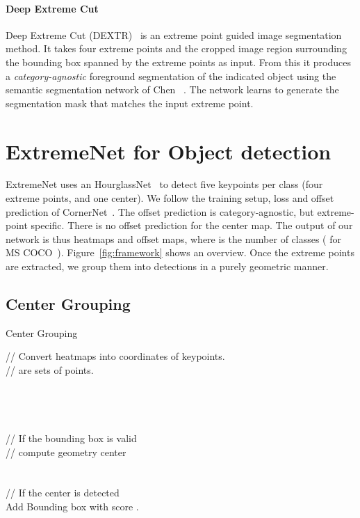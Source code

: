 \documentclass[10pt,twocolumn,letterpaper]{article}
\begin{document}
\paragraph{Deep Extreme Cut}
Deep Extreme Cut (DEXTR)~\cite{Man+18} is an extreme point guided image segmentation method. 
It takes four extreme points and the cropped image region surrounding the bounding box spanned by the extreme points as input.
From this it produces a \emph{category-agnostic} foreground segmentation of the indicated object using the semantic segmentation network of Chen \etal~\cite{chen2018deeplab}.
The network learns to generate the segmentation mask that matches the input extreme point. 

\section{ExtremeNet for Object detection}

ExtremeNet uses an HourglassNet~\cite{newell2016stacked} to detect five keypoints per class (four extreme points, and one center).
We follow the training setup, loss and offset prediction of CornerNet~\cite{Law_2018_ECCV}.
The offset prediction is category-agnostic, but extreme-point specific.
There is no offset prediction for the center map.
The output of our network is thus  heatmaps and  offset maps, where  is the number of classes ( for MS COCO~\cite{lin2014microsoft}).
Figure~\ref{fig:framework} shows an overview.
Once the extreme points are extracted, we group them into detections in a purely geometric manner.

\subsection{Center Grouping}
\label{sec:grouping}
\begin{algorithm}[t]\footnotesize
	\caption{\footnotesize Center Grouping}
	\label{alg:size_balance}
	 
		 // Convert heatmaps into coordinates of keypoints. \\
		 //  are sets of points. \\
		  \\
		  \\
		  \\
		  \\
		 \For{, , , } {
		    // If the bounding box is valid\\
		     {
                // compute geometry center \\
                 \\
                 \\
                // If the center is detected \\
                \If {} {
                    Add Bounding box  with score .
                }
            }
		 }
	\label{alg:grouping}

\end{algorithm}
\end{document}
